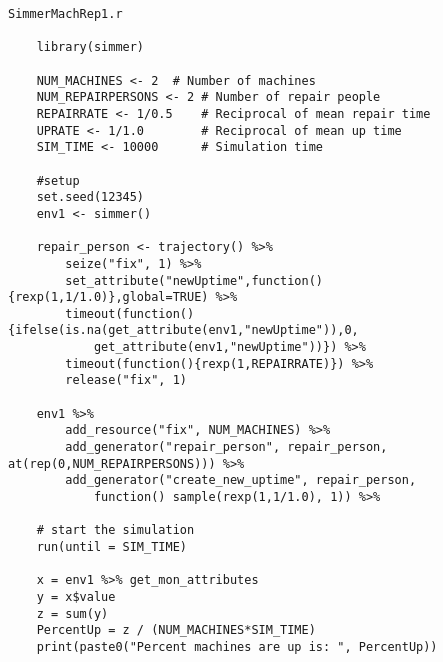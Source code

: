 \documentclass[titlepage]{article}
\begin{document}
\begin{verbatim}
SimmerMachRep1.r

    library(simmer)

    NUM_MACHINES <- 2  # Number of machines
    NUM_REPAIRPERSONS <- 2 # Number of repair people
    REPAIRRATE <- 1/0.5    # Reciprocal of mean repair time
    UPRATE <- 1/1.0        # Reciprocal of mean up time 
    SIM_TIME <- 10000      # Simulation time 

    #setup
    set.seed(12345)
    env1 <- simmer()

    repair_person <- trajectory() %>%
        seize("fix", 1) %>%
        set_attribute("newUptime",function(){rexp(1,1/1.0)},global=TRUE) %>%
        timeout(function() {ifelse(is.na(get_attribute(env1,"newUptime")),0,
            get_attribute(env1,"newUptime"))}) %>%
        timeout(function(){rexp(1,REPAIRRATE)}) %>%
        release("fix", 1) 

    env1 %>%
        add_resource("fix", NUM_MACHINES) %>%
        add_generator("repair_person", repair_person, at(rep(0,NUM_REPAIRPERSONS))) %>%
        add_generator("create_new_uptime", repair_person, 
            function() sample(rexp(1,1/1.0), 1)) %>%

    # start the simulation
    run(until = SIM_TIME)

    x = env1 %>% get_mon_attributes
    y = x$value
    z = sum(y)
    PercentUp = z / (NUM_MACHINES*SIM_TIME)
    print(paste0("Percent machines are up is: ", PercentUp))

\end{verbatim}

\clearpage
\end{document}
